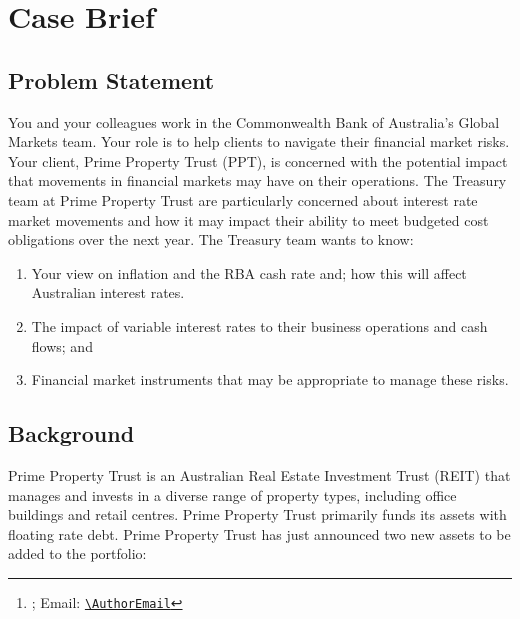\documentclass[11pt, a4paper, british]{article}
\title{\PaperTitle}
\author{%
    \AuthorName
    \thanks{\AuthorAffiliation; Email: \href{mailto:\AuthorEmail}{\nolinkurl{\AuthorEmail}}}
}
\date{\today}
\begin{document}
\maketitle
\begin{abstract}
    \noindent
    This is a \LaTeX\ writeup of my progression through a preponderance of alternative hedging strategies
\end{abstract}


\thispagestyle{empty}

\clearpage
\tableofcontents
\listoftables
\listofalgorithms
\thispagestyle{empty}
\clearpage


\section{Case Brief}

\subsection{Problem Statement}
You and your colleagues work in the Commonwealth Bank of Australia's Global Markets team. Your role is to help clients to navigate their financial market risks. Your client, Prime Property Trust (PPT), is concerned with the potential impact that movements in financial markets may have on their operations. The Treasury team at Prime Property Trust are particularly concerned about interest rate market movements and how it may impact their ability to meet budgeted cost obligations over the next year. The Treasury team wants to know:

\begin{enumerate}
    \item Your view on inflation and the RBA cash rate and; how this will affect Australian interest rates.
    \item The impact of variable interest rates to their business operations and cash flows; and
    \item Financial market instruments that may be appropriate to manage these risks.
\end{enumerate}

\subsection{Background}
Prime Property Trust is an Australian Real Estate Investment Trust (REIT) that manages and invests in a diverse range of property types, including office buildings and retail centres. Prime Property Trust primarily funds its assets with floating rate debt. Prime Property Trust has just announced two new assets to be added to the portfolio:
\end{document}
